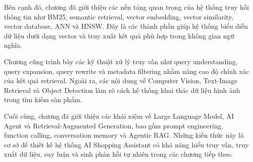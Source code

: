 Bên cạnh đó, chương đã giới thiệu các nền tảng quan trọng của hệ thống truy hồi thông tin như BM25, semantic retrieval, vector embedding, vector similarity, vector database, ANN và HNSW. Đây là các thành phần giúp hệ thống biểu diễn dữ liệu dưới dạng vector và truy xuất kết quả phù hợp trong không gian ngữ nghĩa.

Chương cũng trình bày các kỹ thuật xử lý truy vấn như query understanding, query expansion, query rewrite và metadata filtering nhằm nâng cao độ chính xác của kết quả retrieval. Ngoài ra, các nội dung về Computer Vision, Text-Image Retrieval và Object Detection làm rõ cách hệ thống khai thác dữ liệu hình ảnh trong tìm kiếm sản phẩm.

Cuối cùng, chương đã giới thiệu các khái niệm về Large Language Model, AI Agent và Retrieval-Augmented Generation, bao gồm prompt engineering, function calling, conversation memory và Agentic RAG. Những kiến thức này là cơ sở để thiết kế hệ thống AI Shopping Assistant có khả năng hiểu truy vấn, truy xuất dữ liệu, suy luận và sinh phản hồi tự nhiên trong các chương tiếp theo.